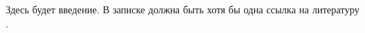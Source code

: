 \Introduction

Здесь будет введение. В записке должна быть хотя бы одна ссылка на литературу \cite{sqlite}.
